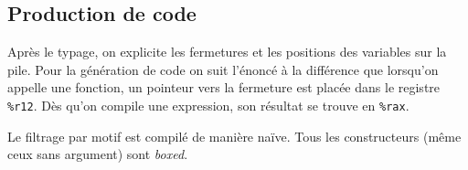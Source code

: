 \documentclass[11pt]{article}
\begin{document}
\subsection{Production de code}
Après le typage, on explicite les fermetures et les positions des variables sur
la pile. Pour la génération de code on suit l'énoncé à la différence que
lorsqu'on appelle une fonction, un pointeur vers la fermeture est placée dans le
registre \texttt{\%r12}. Dès qu'on compile une expression, son résultat se
trouve en \texttt{\%rax}.

Le filtrage par motif est compilé de manière naïve. Tous les constructeurs (même
ceux sans argument) sont \textit{boxed}.
\end{document}
